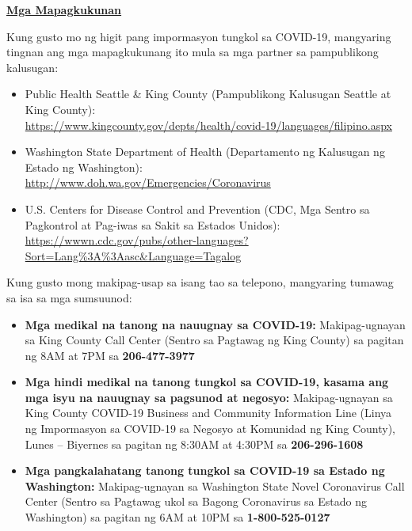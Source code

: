\documentclass[10pt]{article}
\begin{document}
\large \underline{\textbf{Mga Mapagkukunan}}

Kung gusto mo ng higit pang impormasyon tungkol sa COVID-19, mangyaring tingnan
ang mga mapagkukunang ito mula sa mga partner sa pampublikong kalusugan:

\begin{itemize}
\item
  Public Health \textemdash Seattle \& King County (Pampublikong Kalusugan
  \textemdash Seattle at King County): \\
  \url{https://www.kingcounty.gov/depts/health/covid-19/languages/filipino.aspx}

\item

  Washington State Department of Health (Departamento ng Kalusugan ng Estado ng
  Washington): \\
  \url{http://www.doh.wa.gov/Emergencies/Coronavirus}

\item
  U.S. Centers for Disease Control and Prevention (CDC, Mga Sentro sa Pagkontrol
  at Pag-iwas sa Sakit sa Estados Unidos):\\
  \url{https://wwwn.cdc.gov/pubs/other-languages?Sort=Lang%3A%3Aasc&Language=Tagalog}

\end{itemize}

Kung gusto mong makipag-usap sa isang tao sa telepono, mangyaring tumawag sa isa
sa mga sumsuunod:

\begin{itemize}

\item

  \textbf{Mga medikal na tanong na nauugnay sa COVID-19:} Makipag-ugnayan sa King County Call Center
  (Sentro sa Pagtawag ng King County) sa pagitan ng 8AM at 7PM sa
  \textbf{206-477-3977}

\item

  \textbf{Mga hindi medikal na tanong tungkol sa COVID-19, kasama ang mga isyu
  na nauugnay sa pagsunod at negosyo:} Makipag-ugnayan sa King County COVID-19
  Business and Community Information Line (Linya ng Impormasyon sa COVID-19 sa
  Negosyo at Komunidad ng King County), Lunes – Biyernes sa pagitan ng 8:30AM at
  4:30PM sa \textbf{206-296-1608}

\item

  \textbf{Mga pangkalahatang tanong tungkol sa COVID-19 sa Estado ng
  Washington:} Makipag-ugnayan sa Washington State Novel Coronavirus Call Center
  (Sentro sa Pagtawag ukol sa Bagong Coronavirus sa Estado ng Washington) sa
  pagitan ng 6AM at 10PM sa \textbf{1-800-525-0127}

\end{itemize}
\end{document}
